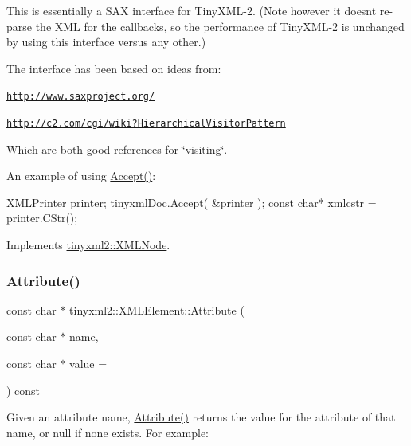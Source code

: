 This is essentially a S\+AX interface for Tiny\+X\+M\+L-\/2. (Note however it doesn\textquotesingle{}t re-\/parse the X\+ML for the callbacks, so the performance of Tiny\+X\+M\+L-\/2 is unchanged by using this interface versus any other.)

The interface has been based on ideas from\+:


\begin{DoxyItemize}
\item \href{http://www.saxproject.org/}{\tt http\+://www.\+saxproject.\+org/}
\item \href{http://c2.com/cgi/wiki?HierarchicalVisitorPattern}{\tt http\+://c2.\+com/cgi/wiki?\+Hierarchical\+Visitor\+Pattern}
\end{DoxyItemize}

Which are both good references for \char`\"{}visiting\char`\"{}.

An example of using \hyperlink{classtinyxml2_1_1_x_m_l_element_a9b2119831e8b85827d5d3e5076788e4a}{Accept()}\+: \begin{DoxyVerb}XMLPrinter printer;
tinyxmlDoc.Accept( &printer );
const char* xmlcstr = printer.CStr();
\end{DoxyVerb}
 

Implements \hyperlink{classtinyxml2_1_1_x_m_l_node_a81e66df0a44c67a7af17f3b77a152785}{tinyxml2\+::\+X\+M\+L\+Node}.

\mbox{\label{classtinyxml2_1_1_x_m_l_element_a48cf4a315cfbac7d74cd0d5ff2c5df51}} 
\subsubsection{\texorpdfstring{Attribute()}{Attribute()}}
{\footnotesize\ttfamily const char $\ast$ tinyxml2\+::\+X\+M\+L\+Element\+::\+Attribute (\begin{DoxyParamCaption}\item[{const char $\ast$}]{name,  }\item[{const char $\ast$}]{value = {} }\end{DoxyParamCaption}) const}

Given an attribute name, \hyperlink{classtinyxml2_1_1_x_m_l_element_a48cf4a315cfbac7d74cd0d5ff2c5df51}{Attribute()} returns the value for the attribute of that name, or null if none exists. For example\+:


